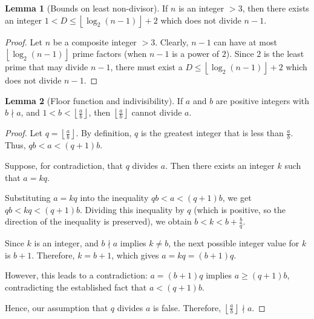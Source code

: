 \documentclass{article}
\theoremstyle{plain}
\theoremstyle{definition}
\newtheorem{lemma}{Lemma}
\begin{document}
\begin{lemma}[Bounds on least non-divisor] \label{lemma:leastnondivisor}
If $n$ is an integer $> 3$, then there exists an integer $1 < D \leq \left\lfloor\log_2(n-1)\right\rfloor + 2$ which does not divide $n-1$.
\end{lemma}
\begin{proof}
Let $n$ be a composite integer $> 3$. Clearly, $n-1$ can have at most $\left\lfloor\log_2(n-1)\right\rfloor$ prime factors (when $n-1$ is a power of $2$). Since $2$ is the least prime that may divide $n-1$, there must exist a $D \leq \left\lfloor\log_2(n-1)\right\rfloor + 2$ which does not divide $n-1$.
\end{proof}

\begin{lemma}[Floor function and indivisibility]
\label{lemma:floornondivisor}
If \(a\) and \(b\) are positive integers with \(b \nmid a\), 
and \( 1 < b < \left\lfloor \frac{a}{b} \right\rfloor \), then \(\left\lfloor \frac{a}{b} \right\rfloor\) 
cannot divide \(a\).
\end{lemma}
\begin{proof}
Let \(q = \left\lfloor \frac{a}{b} \right\rfloor\). By definition, \(q\) is the greatest integer that is less than \(\frac{a}{b}\). Thus, \(qb < a < (q + 1)b\).

Suppose, for contradiction, that \(q\) divides \(a\). Then there exists an integer \(k\) such that \(a = k q\).

Substituting \(a = k q\) into the inequality \(qb < a < (q + 1) b\), we get \(qb < kq < (q + 1) b\). Dividing this inequality by \(q\) (which is positive, so the direction of the inequality is preserved), we obtain \(b < k < b + \frac{b}{q}\).

Since \(k\) is an integer, and \(b \nmid a\) implies \(k \neq b\), the next possible integer value for \(k\) is \(b + 1\). Therefore, \(k = b + 1\), which gives \(a = k q = (b + 1) q\). 

However, this leads to a contradiction: \(a = (b + 1) q\) implies \(a \geq (q + 1) b\), contradicting the established fact that \(a < (q + 1) b\).

Hence, our assumption that \(q\) divides \(a\) is false. Therefore, \(\left\lfloor \frac{a}{b} \right\rfloor \nmid a\).
\end{proof}
\end{document}

